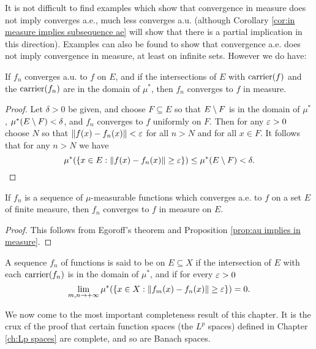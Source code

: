 It is not difficult to find examples which show that convergence in measure does not imply converges a.e., much less converges a.u. (although Corollary \ref{cor:in measure implies subsequence ae} will show that there is a partial implication in this direction). Examples can also be found to show that convergence a.e. does not imply convergence in measure, at least on infinite sets. However we do have:

\begin{proposition}\label{prop:au implies in measure}
If $f_n$ converges a.u. to $f$ on $E$, and if the intersections of $E$ with $\operatorname{carrier}(f)$ and the $\operatorname{carrier}(f_n)$ are in the domain of $\mu^*$, then $f_n$ converges to $f$ in measure. 
\end{proposition}

\begin{proof}
Let $\delta>0$ be given, and choose $F\subseteq E$ so that $E\setminus F$ is in the domain of $\mu^*$, $\mu^*(E\setminus F)<\delta$, and $f_n$ converges to $f$ uniformly on $F$. Then for any $\varepsilon>0$ choose $N$ so that $\norm{f(x)-f_n(x)}<\varepsilon$ for all $n>N$ and for all $x\in F$. It follows that for any $n>N$ we have \[\mu^*(\left\{x\in E:\norm{f(x)-f_n(x)}\geq\varepsilon\right\})\leq\mu^*(E\setminus F)<\delta.\]
\end{proof}

\begin{corollary}
If $f_n$ is a sequence of $\mu$-measurable functions which converges a.e. to $f$ on a set $E$ of finite measure, then $f_n$ converges to $f$ in measure on $E$.
\end{corollary}

\begin{proof}
This follows from Egoroff's theorem and Proposition \ref{prop:au implies in measure}.
\end{proof}

\begin{definition}
A sequence $f_n$ of functions is said to be  on $E\subseteq X$ if the intersection of $E$ with each $\operatorname{carrier}(f_n)$ is in the domain of $\mu^*$, and if for every $\varepsilon>0$ \[\lim_{m,n\to+\infty}\mu^*(\left\{x\in X:\norm{f_m(x)-f_n(x)}\geq\varepsilon\right\})=0.\]
\end{definition}

We now come to the most important completeness result of this chapter. It is the crux cf the proof that certain function spaces (the $L^p$ spaces) defined in Chapter \ref{ch:Lp spaces} are complete, and so are Banach spaces.


